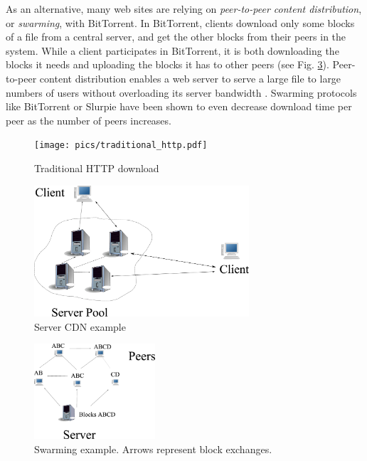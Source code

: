As an alternative, many web sites are relying on \emph{peer-to-peer content distribution}, or \emph{swarming}, with BitTorrent.  In BitTorrent, clients download only some blocks of a file from a central server, and get the other blocks from their peers in the system.  While a client participates in BitTorrent, it is both downloading the blocks it needs and uploading the blocks it has to other peers (see Fig. \ref{fig:normal_swarm}).  Peer-to-peer content distribution enables a web server to serve a large file to large numbers of users without overloading its server bandwidth \cite{zappala}. Swarming protocols like BitTorrent \cite{cohen} or Slurpie \cite{slurpie} have been shown to even decrease download time per peer as the number of peers increases. 
\begin{figure}
\begin{center}
   \texttt{[image: pics/traditional\_http.pdf]}
    \caption{Traditional HTTP download}
 \label{fig:traditional_http}
 \end{center}
\end{figure}
\begin{figure}
    \centering
  \includegraphics[width=8cm]{pics/server_side_only.eps}
  \caption{Server CDN example}
  \label{fig:server_only}
\end{figure}   
\begin{figure}
 \centering
 \includegraphics[width=4.5cm]{pics/normal_swarm.eps}
 \caption{Swarming example.  Arrows represent block exchanges.}
 \label{fig:normal_swarm}
\end{figure}

